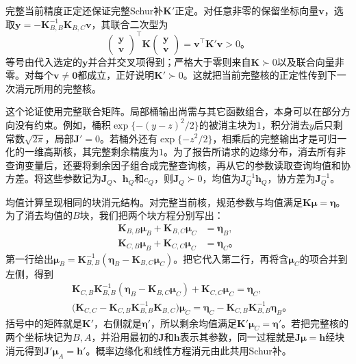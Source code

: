 完整当前精度正定还保证完整Schur补$\bm{K}'$正定。对任意非零的保留坐标向量$\bm{v}$，选取$\bm{y}=-\bm{K}_{B,B}^{-1}\bm{K}_{B,C}\bm{v}$，其联合二次型为
\[
  \begin{pmatrix}\bm{y}\\\bm{v}\end{pmatrix}^{\top}
  \bm{K}
  \begin{pmatrix}\bm{y}\\\bm{v}\end{pmatrix}
  =\bm{v}^{\top}\bm{K}'\bm{v}>0
  \text{。}
\]
等号由代入选定的$\bm{y}$并合并交叉项得到；严格大于零则来自$\bm{K}\succ0$以及联合向量非零。对每个$\bm{v}\ne\bm{0}$都成立，正好说明$\bm{K}'\succ0$。这就把当前完整核的正定性传到下一次消元所用的完整核。

这个论证使用完整联合矩阵。局部桶输出尚需与其它函数组合，本身可以在部分方向没有约束。例如，桶积$\exp\{-(y-z)^2/2\}$的被消主块为$1$，积分消去$y$后只剩常数$\sqrt{2\pi}$，局部$\bm{J}'=0$。若桶外还有$\exp\{-z^2/2\}$，相乘后的完整输出才是可归一化的一维高斯核，其完整剩余精度为$1$。为了报告所请求的边缘分布，消去所有非查询变量后，还要将剩余因子组合成完整查询核，再从它的参数读取查询均值和协方差。将这些参数记为$\bm{J}_Q$、$\bm{h}_Q$和$c_Q$，则$\bm{J}_Q\succ0$，均值为$\bm{J}_Q^{-1}\bm{h}_Q$，协方差为$\bm{J}_Q^{-1}$。

均值计算呈现相同的块消元结构。对完整当前核，规范参数与均值满足$\bm{K}\bm{\mu}=\bm{\eta}$。为了消去均值的$B$块，我们把两个块方程分别写出：
\[
  \begin{aligned}
    \bm{K}_{B,B}\bm{\mu}_B
      +\bm{K}_{B,C}\bm{\mu}_C&=\bm{\eta}_B,\\
    \bm{K}_{C,B}\bm{\mu}_B
      +\bm{K}_{C,C}\bm{\mu}_C&=\bm{\eta}_C
      \text{。}
  \end{aligned}
\]
第一行给出$\bm{\mu}_B=\bm{K}_{B,B}^{-1}(\bm{\eta}_B-\bm{K}_{B,C}\bm{\mu}_C)$。把它代入第二行，再将含$\bm{\mu}_C$的项合并到左侧，得到
\[
  \begin{aligned}
    &\bm{K}_{C,B}\bm{K}_{B,B}^{-1}
      (\bm{\eta}_B-\bm{K}_{B,C}\bm{\mu}_C)
      +\bm{K}_{C,C}\bm{\mu}_C
      =\bm{\eta}_C,\\
    &\bigl(\bm{K}_{C,C}
      -\bm{K}_{C,B}\bm{K}_{B,B}^{-1}\bm{K}_{B,C}\bigr)
      \bm{\mu}_C
      =\bm{\eta}_C-\bm{K}_{C,B}\bm{K}_{B,B}^{-1}\bm{\eta}_B
      \text{。}
  \end{aligned}
\]
括号中的矩阵就是$\bm{K}'$，右侧就是$\bm{\eta}'$，所以剩余均值满足$\bm{K}'\bm{\mu}_C=\bm{\eta}'$。若把完整核的两个坐标块记为$B,A$，并沿用最初的$\bm{J}$和$\bm{h}$表示其参数，同一过程就是$\bm{J}\bm{\mu}=\bm{h}$经块消元得到$\bm{J}'\bm{\mu}_A=\bm{h}'$。概率边缘化和线性方程消元由此共用Schur补。

